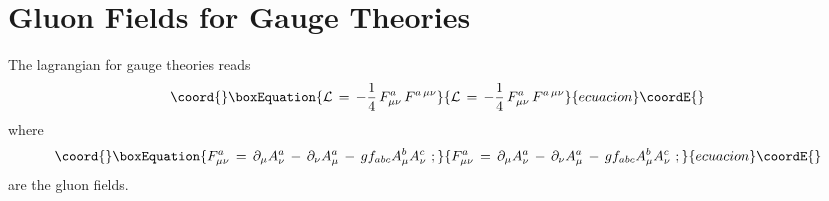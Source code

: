 \documentclass[a4paper,a4paper]{article}
\begin{document}
\section{Gluon Fields for \coordHE{} Gauge Theories}

The lagrangian for \coordHE{} gauge theories reads
\begin{equation}\coord{}\boxEquation{
 \mathcal{L} \, = \, - \frac{1}{4} \, F^a_{\mu\nu} \, F^{a \, \mu\nu}
}{
 \mathcal{L} \, = \, - \frac{1}{4} \, F^a_{\mu\nu} \, F^{a \, \mu\nu}
}{ecuacion}\coordE{}\end{equation}
where
\begin{equation}\coord{}\boxEquation{
 F^a_{\mu\nu} \, = \, \partial_\mu A^a_\nu \, - \,
                      \partial_\nu A^a_\mu  \, - \,
                      g f_{abc} A^b_\mu A^c_\nu
 \mbox{ };
}{
 F^a_{\mu\nu} \, = \, \partial_\mu A^a_\nu \, - \,
                      \partial_\nu A^a_\mu  \, - \,
                      g f_{abc} A^b_\mu A^c_\nu
 \mbox{ };
}{ecuacion}\coordE{}\end{equation}
\coordHE{} are the gluon fields. 
\end{document}
